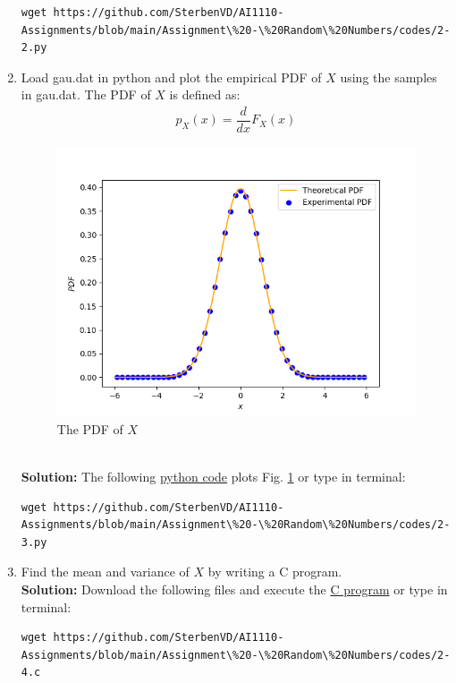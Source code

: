 \documentclass[journal,12pt,twocolumn]{IEEEtran}
\numberwithin{equation}{section}
\renewcommand\thesection{\arabic{section}}
\providecommand{\gitlink}[2]{{\color{blue}\href{https://github.com/SterbenVD/AI1110-Assignments/blob/main/Assignment\%20-\%20Random\%20Numbers/#1}{#2}}}
\newcommand{\solution}{\noindent \textbf{\\ Solution: }}
\begin{document}
\begin{enumerate}[label=\thesection.\arabic*,ref=\thesection.\theenumi]
\begin{lstlisting}
wget https://github.com/SterbenVD/AI1110-Assignments/blob/main/Assignment\%20-\%20Random\%20Numbers/codes/2-2.py
            \end{lstlisting}
    \item Load gau.dat in python and plot the empirical PDF of $X$ using the samples in gau.dat.
          The PDF of $X$ is defined as:
          \begin{align}
              p_{X}(x) = \dfrac{d}{dx}F_{X}(x)
          \end{align}
          \begin{figure}[H]
              \centering
              \includegraphics[width = \columnwidth]{../figs/2_pdf}
              \caption{The PDF of $X$}
              \label{fig:2_pdf}
          \end{figure}
          \solution The following \gitlink{codes/2-3.py}{python code} plots Fig. \ref{fig:2_pdf} or type in terminal:
          \begin{lstlisting}
wget https://github.com/SterbenVD/AI1110-Assignments/blob/main/Assignment\%20-\%20Random\%20Numbers/codes/2-3.py
            \end{lstlisting}
    \item Find the mean and variance of $X$ by writing a C program.
          \solution Download the following files and execute the \gitlink{codes/2-4.c}{C program} or type in terminal:
          \begin{lstlisting}
wget https://github.com/SterbenVD/AI1110-Assignments/blob/main/Assignment\%20-\%20Random\%20Numbers/codes/2-4.c
            \end{lstlisting}

\end{enumerate}
\end{document}
